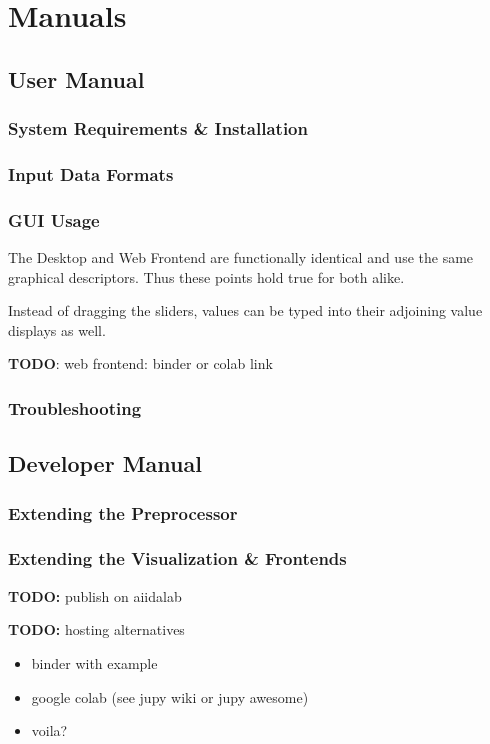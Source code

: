 
\chapter{Manuals}
\label{cha:manuals}

\section{User Manual}
\label{sec:user-manual}

\subsection{System Requirements \& Installation}
\label{sec:system-requirements}

\subsection{Input Data Formats}
\label{sec:input-data-formats}

\subsection{GUI Usage}
\label{sec:gui-usage}

The Desktop and Web Frontend are functionally identical and use the same
graphical descriptors. Thus these points hold true for both alike.

Instead of dragging the sliders, values can be typed into their adjoining value
displays as well.

\textbf{TODO}: web frontend: binder or colab link

\subsection{Troubleshooting}
\label{sec:troubleshooting}


\section{Developer Manual}
\label{sec:developer-manual}

\subsection{Extending the Preprocessor}
\label{sec:extend-prepr}

\subsection{Extending the Visualization \& Frontends}
\label{sec:extend-visu-}

\textbf{TODO:} publish on aiidalab 

\textbf{TODO:} hosting alternatives
\begin{itemize}
\item binder with example
\item google colab (see jupy wiki or jupy awesome) \cite{jupyter-awesome}
\item voila?
\end{itemize}







